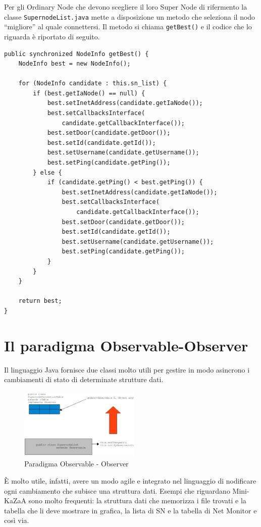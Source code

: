 Per gli Ordinary Node che devono scegliere il loro Super Node di rifermento la classe \verb|SupernodeList.java| mette a disposizione un metodo che seleziona il nodo ``migliore'' al quale connettersi. Il metodo si chiama \verb|getBest()| e il codice che lo riguarda è riportato di seguito.
\begin{lstlisting}
public synchronized NodeInfo getBest() {
	NodeInfo best = new NodeInfo();

	for (NodeInfo candidate : this.sn_list) {
		if (best.getIaNode() == null) {
			best.setInetAddress(candidate.getIaNode());
			best.setCallbacksInterface(
				candidate.getCallbackInterface());
			best.setDoor(candidate.getDoor());
			best.setId(candidate.getId());
			best.setUsername(candidate.getUsername());
			best.setPing(candidate.getPing());
		} else {
			if (candidate.getPing() < best.getPing()) {
				best.setInetAddress(candidate.getIaNode());
				best.setCallbacksInterface(
					candidate.getCallbackInterface());
				best.setDoor(candidate.getDoor());
				best.setId(candidate.getId());
				best.setUsername(candidate.getUsername());
				best.setPing(candidate.getPing());
			}
		}
	}
	
	return best;
}
\end{lstlisting}


\section{Il paradigma Observable-Observer}\label{sec:obs-obs}

Il linguaggio Java fornisce due classi molto utili per gestire in modo asincrono i cambiamenti di stato di determinate strutture dati.

\begin{figure}[t]
 \centering
 \includegraphics[width=218.72px,height=129.12px,bb=14 14 635 381]{images/observable.eps}
 \caption{Paradigma Observable - Observer}
 \label{fig:observable}
\end{figure}

\`{E} molto utile, infatti, avere un modo agile e integrato nel linguaggio di nodificare ogni cambiamento che subisce una struttura dati. Esempi che riguardano Mini-KaZaA sono molto frequenti: la struttura dati che memorizza i file trovati e la tabella che li deve mostrare in grafica, la lista di SN e la tabella di Net Monitor e così via.

